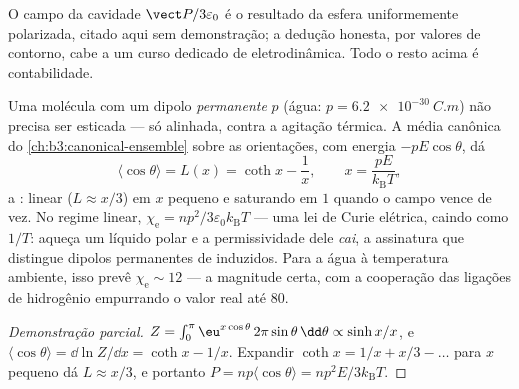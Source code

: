 \begin{remark}
O campo da cavidade $\vect P/3\varepsilon_0$ é o resultado da esfera
uniformemente polarizada, citado aqui sem demonstração; a dedução
honesta, por valores de contorno, cabe a um curso dedicado de
eletrodinâmica. Todo o resto acima é contabilidade.
\end{remark}

\begin{proposition}\label{prop:b3:electromagnetism-in-matter:langevin}
Uma molécula com um dipolo \emph{permanente} $p$ (água:
$p = \qty{6.2e-30}{C.m}$) não precisa ser esticada --- só alinhada,
contra a agitação térmica. A média canônica do
\cref{ch:b3:canonical-ensemble} sobre as orientações, com energia
$-pE\cos\theta$, dá
\[
\langle\cos\theta\rangle = L(x) = \coth x - \frac1x ,
\qquad x = \frac{pE}{k_{\text{B}}T} ,
\]
a \emph{}: linear ($L \approx x/3$) em $x$ pequeno e
saturando em $1$ quando o campo vence de vez. No regime linear,
$\chi_{\text{e}} = np^2/3\varepsilon_0k_{\text{B}}T$ --- uma lei de
Curie elétrica, caindo como $1/T$: aqueça um líquido polar e a
permissividade dele \emph{cai}, a assinatura que distingue dipolos
permanentes de induzidos. Para a água à temperatura ambiente, isso prevê
$\chi_{\text{e}} \sim 12$ --- a magnitude certa, com a cooperação das
ligações de hidrogênio empurrando o valor real até $80$.
\end{proposition}

\begin{proof}[Demonstração parcial]
$Z = \int_0^\pi \eu^{x\cos\theta}\,2\pi\sin\theta\,\dd\theta \propto
\sinh x/x$, e $\langle\cos\theta\rangle = \dd\ln Z/\dd x = \coth x
- 1/x$. Expandir $\coth x = 1/x + x/3 - \dots$ para $x$ pequeno dá
$L \approx x/3$, e portanto $P = np\langle\cos\theta\rangle =
np^2E/3k_{\text{B}}T$.
\end{proof}

